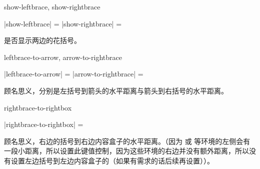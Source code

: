 \documentclass{xdyy-usermanual}
\begin{document}
\begin{function}[added = 2022-01-12]{show-leftbrace, show-rightbrace}
  \begin{syntax}
    |show-leftbrace| =  
    |show-rightbrace| =  
  \end{syntax}
  是否显示两边的花括号。
\end{function}

\begin{function}[added = 2022-01-12]{leftbrace-to-arrow, arrow-to-rightbrace}
  \begin{syntax}
    |leftbrace-to-arrow| =  \init{7pt}
    |arrow-to-rightbrace| =  \init{2pt}
  \end{syntax}
  顾名思义，分别是左括号到箭头的水平距离与箭头到右括号的水平距离。
\end{function}

\begin{function}[added = 2022-01-12]{rightbrace-to-rightbox}
  \begin{syntax}
    |rightbrace-to-rightbox| =  \init{3mm}
  \end{syntax}
  顾名思义，右边的括号到右边内容盒子的水平距离。（因为  或  等环境的左侧会有一段小距离，所以设置此键值控制，因为这些环境的右边并没有额外距离，所以没有设置左边括号到左边内容盒子的（如果有需求的话后续再设置））。
\end{function}
\end{document}
